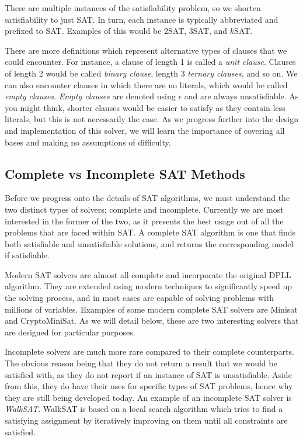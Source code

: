 \documentclass{article}
\begin{document}
There are multiple instances of the satisfiability problem, so we shorten satisfiability to just
SAT. In turn, each instance is typically abbreviated and prefixed to SAT. Examples of this would
be 2SAT, 3SAT, and $k$SAT.

There are more definitions which represent alternative types of clauses that we could encounter. For  instance, a clause of
length 1 is called a \textit{unit clause}. Clauses of length 2
would be called \textit{binary clause}, length 3 \textit{ternary clauses}, and so on. We can also
encounter clauses in which there are no literals, which would be called \textit{empty clauses}.
\textit{Empty clauses} are denoted using $\epsilon$ and are always unsatisfiable. As you might
think, shorter clauses would be easier to satisfy as they contain less literals, but this is not
necessarily the case. As we progress further into the design and implementation of this solver, we
will learn the importance of covering all bases and making no assumptions of difficulty.

\subsection{Complete vs Incomplete SAT Methods}
Before we progress onto the details of SAT algorithms, we must understand the two distinct types of
solvers; complete and incomplete. Currently we are most interested in the former of the two, as it
presents the best usage out of all the problems that are faced within SAT. A complete SAT algorithm
is one that finds both satisfiable and unsatisfiable solutions, and returns the corresponding model
if satisfiable.

Modern SAT solvers are almost all complete and incorporate the original DPLL algorithm. They are extended using modern techniques
to significantly speed up the solving process, and in most cases are capable of solving problems with millions of variables.
Examples of some modern complete SAT solvers are Minisat and CryptoMiniSat. As we will detail below, these are two interesting
solvers that are designed for particular purposes.

Incomplete solvers are much more rare compared to their complete counterparts. The obvious reason being that they do not return a
result that we would be satisfied with, as they do not report if an instance of SAT is unsatisfiable. Aside from this, they do
have their uses for specific types of SAT problems, hence why they are still being developed today. An example of an incomplete
SAT solver is \textit{WalkSAT}. WalkSAT is based on a local search algorithm which tries to find a satisfying assignment by
iteratively improving on them until all constraints are satisfied.
\end{document}
